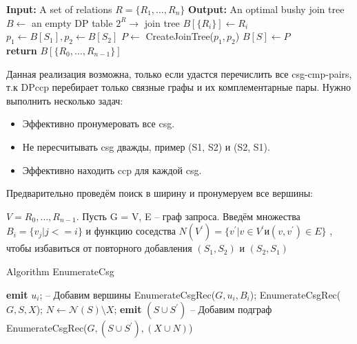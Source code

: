 \documentclass[12pt]{article}
\begin{document}
\begin{flushleft}
\begin{algorithm}[H]
    \begin{algorithmic}[1]
        \State \textbf{Input:} A set of relations $R = \{R_1, \dots, R_n\}$
        \State \textbf{Output:} An optimal bushy join tree
        \State $B \gets$ an empty DP table $2^R \to$ join tree
            \State $B[\{R_i\}] \gets R_i$
        \EndFor
            \State $p_1 \gets B[S_1], p_2 \gets B[S_2]$
            \State $P \gets$ CreateJoinTree($p_1, p_2$)
                \State $B[S] \gets P$
            \EndIf
        \EndFor \\
        \textbf{return} $B[\{R_0, \dots, R_{n-1}\}]$
    \end{algorithmic}
\end{algorithm}

Данная реализация возможна, только если удастся перечислить все 
csg-cmp-pairs, т.к DPccp перебирает только связные графы и их комплементарные пары.
Нужно выполнить несколько задач: 
\begin{itemize}
    \item Эффективно пронумеровать все csg.
    \item Не пересчитывать csg дважды, пример (S1, S2) и (S2, S1).
    \item Эффективно находить ccp для каждой csg.
\end{itemize}

Предварительно проведём поиск в ширину и пронумеруем все вершины:

$V = {R_0, \dots,R_{n-1}}$.
Пусть G = {V, E} -- граф запроса.
Введём множества $B_i = \{v_j | j <= i\}$ и функцию соседства 
$N(V^{'}) = \{v^{'} | v \in V^{'} и (v,v^{'}) \in E\}$ , 
чтобы избавиться от повторного добавления $(S_1, S_2)$ и $(S_2, S_1)$
\newline

\begin{algorithm}
    Algorithm EnumerateCsg
    \begin{algorithmic}[1]
            \State \textbf{emit} $u_i$; -- Добавим вершины
            \State EnumerateCsgRec($G, u_i, B_i$);
        \EndFor
        \State EnumerateCsgRec($G, S, X$);
        \State $N \gets \mathcal{N}(S) \setminus X$;
            \State \textbf{emit} $(S \cup S^{'})$ -- Добавим подграф
        \EndFor 
            \State EnumerateCsgRec($G, (S \cup S^{'}), (X \cup N)$)
        \EndFor 
    \end{algorithmic}
\end{algorithm}


\end{flushleft}
\end{document}
